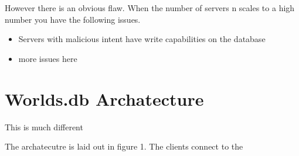 \documentclass[runningheads,a4paper]{llncs}
\begin{document}
However there is an obvious flaw. When the number of servers n scales to a high
number you have the following issues.

\begin{itemize}
\item Servers with malicious intent have write capabilities on the database
\item more issues here
\end{itemize}

\section{Worlds.db Archatecture}
This is much different

The archatecutre is laid out in figure 1. The clients connect to the
\end{document}
